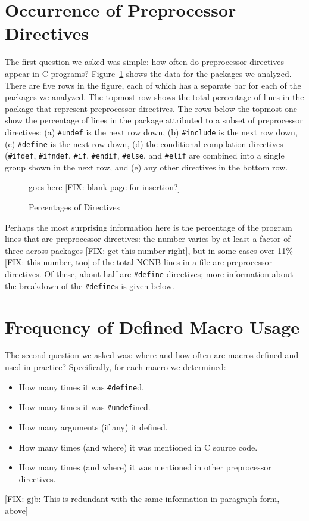 \section{Occurrence of Preprocessor Directives}\label{sec:directives}

The first question we asked was simple: how often do
preprocessor directives appear in C programs?
Figure~\ref{fig:directives} shows the data for the packages we
analyzed.  There are five rows in the figure, each of which has a
separate bar for each of the packages we analyzed.  The topmost row
shows the total percentage of lines in the package that represent
preprocessor directives.  The rows below the topmost one show the
percentage of lines in the package attributed to a subset of
preprocessor directives: (a) \verb+#undef+ is the next row down, (b)
\verb+#include+ is the next row down, (c) \verb+#define+ is the next
row down, (d) the conditional compilation directives (\verb+#ifdef+,
\verb+#ifndef+, \verb+#if+, \verb+#endif+, \verb+#else+, and
\verb+#elif+ are combined into a single group shown in the next row,
and (e) any other directives in the bottom row. 

\begin{figure}
goes here [FIX: blank page for insertion?]
\caption{Percentages of Directives\label{fig:directives}}
\end{figure}

Perhaps the most surprising information here is the percentage of the
program lines that are preprocessor directives: the number varies by
at least a factor of three across packages [FIX: get this number
right], but in some cases over 11\% [FIX: this number, too] of the
total NCNB lines in a file are preprocessor directives.  Of these,
about half are \verb+#define+ directives; more information about the
breakdown of the \verb+#define+s is given below.

\section{Frequency of Defined Macro Usage}\label{sec:usage}

The second question we asked was: where and how often are macros
defined and used in practice?  Specifically, for each macro we
determined:
\begin{itemize}

\item How many times it was \verb+#define+d.
\item How many times it was \verb+#undef+ined.
\item How many arguments (if any) it defined.
\item How many times (and where) it was mentioned in C source code.
\item How many times (and where) it was mentioned in other
preprocessor directives.

\end{itemize}
[FIX: gjb: This is redundant with the same information in paragraph
form, above]

